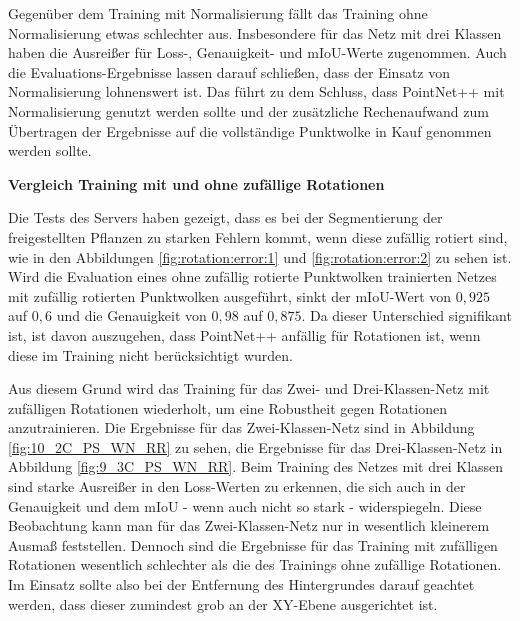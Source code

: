 \documentclass[12pt,titlepage, twoside]{article}
\begin{document}
Gegenüber dem Training mit Normalisierung fällt das Training ohne Normalisierung etwas schlechter aus. 
Insbesondere für das Netz mit drei Klassen haben die Ausreißer für Loss-, Genauigkeit- und mIoU-Werte zugenommen. 
Auch die Evaluations-Ergebnisse lassen darauf schließen, dass der Einsatz von Normalisierung lohnenswert ist.
Das führt zu dem Schluss, dass PointNet++ mit Normalisierung genutzt werden sollte und der zusätzliche Rechenaufwand zum Übertragen der Ergebnisse auf die vollständige Punktwolke in Kauf genommen werden sollte.

\textbf{Vergleich Training mit und ohne zufällige Rotationen}

Die Tests des Servers haben gezeigt, dass es bei der Segmentierung der freigestellten Pflanzen zu starken Fehlern kommt, wenn diese zufällig rotiert sind, wie in den Abbildungen \ref{fig:rotation:error:1} und \ref{fig:rotation:error:2} zu sehen ist.
Wird die Evaluation eines ohne zufällig rotierte Punktwolken trainierten Netzes mit zufällig rotierten Punktwolken ausgeführt, 
sinkt der mIoU-Wert von $0,925$ auf $0,6$ und die Genauigkeit von $0,98$ auf $0,875$.
Da dieser Unterschied signifikant ist, ist davon auszugehen, dass PointNet++ anfällig für Rotationen ist, wenn diese im Training nicht berücksichtigt wurden.

Aus diesem Grund wird das Training für das Zwei- und Drei-Klassen-Netz mit zufälligen Rotationen wiederholt, um eine Robustheit gegen Rotationen anzutrainieren.
Die Ergebnisse für das Zwei-Klassen-Netz sind in Abbildung \ref{fig:10_2C_PS_WN_RR} zu sehen, die Ergebnisse für das Drei-Klassen-Netz in Abbildung \ref{fig:9_3C_PS_WN_RR}. 
Beim Training des Netzes mit drei Klassen sind starke Ausreißer in den Loss-Werten zu erkennen, die sich auch in der Genauigkeit und dem mIoU - wenn auch nicht so stark - widerspiegeln.
Diese Beobachtung kann man für das Zwei-Klassen-Netz nur in wesentlich kleinerem Ausmaß feststellen. 
Dennoch sind die Ergebnisse für das Training mit zufälligen Rotationen wesentlich schlechter als die des Trainings ohne zufällige Rotationen.
Im Einsatz sollte also bei der Entfernung des Hintergrundes darauf geachtet werden, dass dieser zumindest grob an der XY-Ebene ausgerichtet ist.
\end{document}
